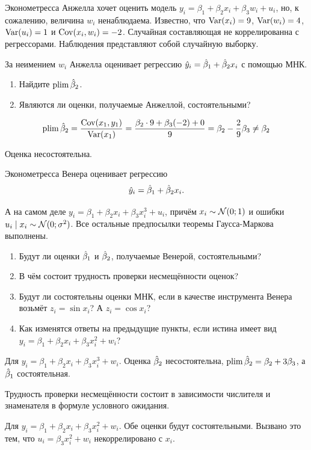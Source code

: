 \begin{problem}
Эконометресса Анжелла хочет оценить модель $y_i=\beta_1+\beta_2 x_i +\beta_3 w_i +u_i$, но, 
к сожалению, величина $w_i$ ненаблюдаема. Известно, что $\operatorname{Var}(x_i)=9$, $\operatorname{Var}(w_i)=4$,  $\operatorname{Var}(u_i)=1$ и $\operatorname{Cov}(x_i,w_i)=-2$. 
Случайная составляющая не коррелированна с регрессорами.
Наблюдения представляют собой случайную выборку.

За неимением $w_i$ Анжелла оценивает регрессию $\hat{y}_i=\hat{\beta}_1+\hat{\beta}_2 x_i$ с помощью МНК.

\begin{enumerate}
\item Найдите $\operatorname*{plim} \hat{\beta}_2$.
\item Являются ли оценки, получаемые Анжеллой, состоятельными?
\end{enumerate}



\begin{sol}
\[
\operatorname*{plim} \hat{\beta}_2 = \frac{\operatorname{Cov}(x_1, y_1)}{\operatorname{Var}(x_1)} = \frac{\beta_2 \cdot 9 + \beta_3 (-2) + 0}{9} = \beta_2 -\frac{2}{9} \beta_3 \neq \beta_2
\]

Оценка несостоятельна.
\end{sol}
\end{problem}






\begin{problem}
  Эконометресса Венера оценивает регрессию
  \[
    \hat{y}_i = \hat{\beta}_1 + \hat{\beta}_2 x_i. 
  \]

  А на самом деле $y_i = \beta_1 + \beta_2 x_i + \beta_3 x_i^3 + u_i$, причём $x_i \sim \mathcal{N} (0; 1)$ и ошибки $u_i \mid x_i \sim \mathcal{N}(0; \sigma^2)$. 
  Все остальные предпосылки теоремы Гаусса-Маркова выполнены.

  \begin{enumerate}
     \item Будут ли оценки $\hat{\beta}_1$ и $\hat{\beta}_2$, получаемые Венерой, состоятельными?
    \item В чём состоит трудность проверки несмещённости оценок?
    \item Будут ли состоятельны оценки МНК, если в качестве инструмента Венера возьмёт $z_i = \sin x_i$?
    А $z_i = \cos x_i$?
    \item Как изменятся ответы на предыдущие пункты, если истина имеет вид  $y_i = \beta_1 + \beta_2 x_i + \beta_3 x_i^2 + w_i$?
  \end{enumerate}

\begin{sol}
  Для $y_i = \beta_1 + \beta_2 x_i + \beta_3 x_i^3 + w_i$.
  Оценка $\hat{\beta}_2$ несостоятельна, $\operatorname*{plim} \hat{\beta}_2 = \beta_2 + 3\beta_3$, а $\hat{\beta}_1$ состоятельная.

  Трудность проверки несмещённости состоит в зависимости числителя и знаменателя в
  формуле условного ожидания.

  Для $y_i = \beta_1 + \beta_2 x_i + \beta_3 x_i^2 + w_i$.
  Обе оценки будут состоятельными. Вызвано это тем, что $u_i = \beta_3 x_i^2 + w_i$ некоррелировано с $x_i$.
\end{sol}
\end{problem}

